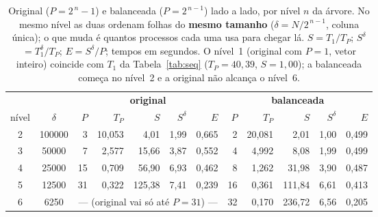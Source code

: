 \documentclass[10pt]{article}
\newcommand{\sd}{\ensuremath{S^{\delta}}}
\begin{document}
\begin{table}[htbp]\centering\footnotesize
\caption{Original ($P=2^{\,n}{-}1$) e balanceada ($P=2^{\,n-1}$) lado a lado, por nível $n$ da árvore.
No mesmo nível as duas ordenam folhas do \textbf{mesmo tamanho} ($\delta=N/2^{\,n-1}$, coluna única);
o que muda é quantos processos cada uma usa para chegar lá. $S=T_1/T_P$; \sd${}=T_1^{\delta}/T_P$;
$E=\sd/P$; tempos em segundos. O nível~1 (original com $P{=}1$, vetor inteiro) coincide com $T_1$ da
Tabela~\ref{tab:seq} ($T_P{=}40{,}39$, $S{=}1{,}00$); a balanceada começa no nível~2 e a original não
alcança o nível~6.}
\label{tab:par}
\begin{tabular}{c c @{\hskip 1em} r r r r r @{\hskip 1.5em} r r r r r}
\toprule
 & & \multicolumn{5}{c}{\textbf{original}} & \multicolumn{5}{c}{\textbf{balanceada}}\\
\cmidrule(lr){3-7}\cmidrule(lr){8-12}
nível & $\delta$ & $P$ & $T_P$ & $S$ & \sd & $E$ & $P$ & $T_P$ & $S$ & \sd & $E$\\
\midrule
2 & 100000 &  3 & 10,053 &   4,01 & 1,99 & 0,665 &  2 & 20,081 &   2,01 & 1,00 & 0,499\\
3 &  50000 &  7 &  2,577 &  15,66 & 3,87 & 0,552 &  4 &  4,992 &   8,08 & 1,99 & 0,499\\
4 &  25000 & 15 &  0,709 &  56,90 & 6,93 & 0,462 &  8 &  1,262 &  31,98 & 3,90 & 0,487\\
5 &  12500 & 31 &  0,322 & 125,38 & 7,41 & 0,239 & 16 &  0,361 & 111,84 & 6,61 & 0,413\\
6 &   6250 & \multicolumn{5}{c}{--- (original vai só até $P{=}31$) ---} & 32 &  0,170 & 236,72 & 6,56 & 0,205\\
\bottomrule
\end{tabular}
\end{table}
\end{document}
